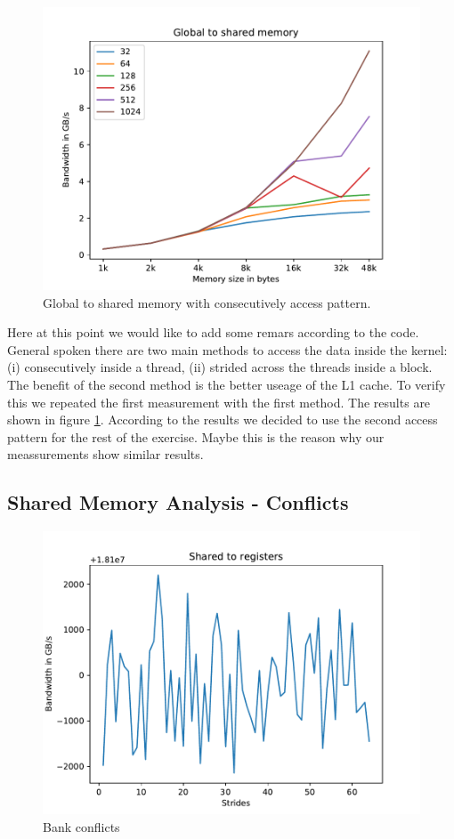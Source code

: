 \documentclass[12pt]{article}
\begin{document}
\begin{figure}
	\centering
	\includegraphics[width=0.7\linewidth]{../../template/plots/aufgabe4_2a_v2}
	\caption{Global to shared memory with consecutively access pattern.}
	\label{fig:aufgabe42av2}
\end{figure}


Here at this point we would like to add some remars according to the code. General spoken there are two main methods to access the data inside the kernel: (i) consecutively inside a thread, (ii) strided across the threads inside a block. The benefit of the second method is the better useage of the L1 cache. To verify this we repeated the first measurement with the first method. The results are shown in figure \ref{fig:aufgabe42av2}. According to the results we decided to use the second access pattern for the rest of the exercise. Maybe this is the reason why our meassurements show similar results. 




\subsection{Shared Memory Analysis - Conflicts}

\begin{figure}
	\centering
	\includegraphics[width=0.7\linewidth]{../../template/plots/aufgabe4_3}
	\caption{Bank conflicts}
	\label{fig:aufgabe43}
\end{figure}
\end{document}
